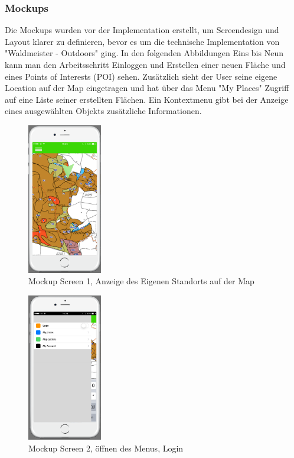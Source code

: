 \subsubsection{Mockups}
Die Mockups wurden vor der Implementation erstellt, um Screendesign und Layout klarer zu definieren, bevor es um die technische Implementation von "Waldmeister - Outdoors" ging. In den folgenden Abbildungen Eins bis Neun kann man den Arbeitsschritt Einloggen und Erstellen einer neuen Fl\"ache und eines Points of Interests (POI) sehen. Zus\"atzlich sieht der User seine eigene Location auf der Map eingetragen und hat \"uber das Menu "My Places" Zugriff auf eine Liste seiner erstellten Fl\"achen. Ein Kontextmenu gibt bei der Anzeige eines ausgew\"ahlten Objekts zus\"atzliche Informationen.

\pagebreak

\begin{figure}[H]
\centering
    \includegraphics[width=0.29\textwidth]{mockup1-1}
    \caption{Mockup Screen 1, Anzeige des Eigenen Standorts auf der Map}
    \label{fig:mesh1}
\end{figure}

\begin{figure}[H]
\centering
    \includegraphics[width=0.29\textwidth]{mockup1-2}
    \caption{Mockup Screen 2, \"offnen des Menus, Login}
    \label{fig:mesh2}
\end{figure}

